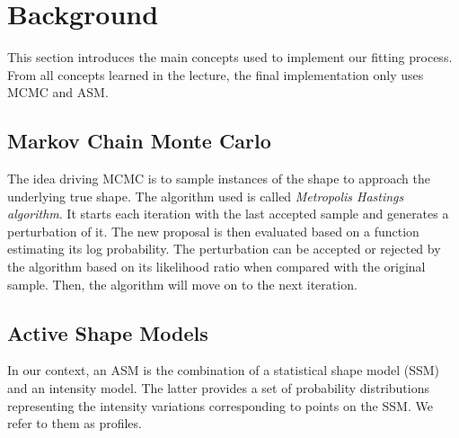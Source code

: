 \section{Background}
\label{sec:background}

This section introduces the main concepts used to implement our fitting process.
From all concepts learned in the lecture, the final implementation only uses MCMC and ASM.


\subsection{Markov Chain Monte Carlo}
\label{subsec:mcmc}

The idea driving MCMC is to sample instances of the shape to approach the underlying true shape.
The algorithm used is called \emph{Metropolis Hastings algorithm}.
It starts each iteration with the last accepted sample and generates a perturbation of it.
The new proposal is then evaluated based on a function estimating its log probability.
The perturbation can be accepted or rejected by the algorithm based on its likelihood ratio when compared with the original sample.
Then, the algorithm will move on to the next iteration.


\subsection{Active Shape Models}
\label{subsec:asm}

In our context, an ASM is the combination of a statistical shape model (SSM) and an intensity model.
The latter provides a set of probability distributions representing the intensity variations corresponding to points on the SSM.
We refer to them as profiles.
